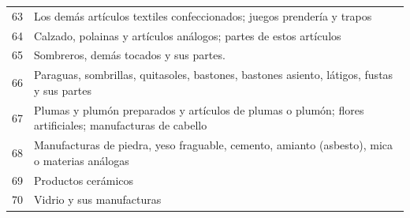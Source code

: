 \documentclass[a4paper,openright,12pt]{book}
\begin{document}
\begin{table}[]
{\begin{tabular}{@{}ll@{}}
63  & Los demás artículos textiles confeccionados; juegos prendería y trapos                                                                                                                                                                                                                         \\
64  & Calzado, polainas y artículos análogos; partes de estos artículos                                                                                                                                                                                                                              \\
65  & Sombreros, demás tocados y sus partes.                                                                                                                                                                                                                                                         \\
66  & Paraguas, sombrillas, quitasoles, bastones, bastones asiento, látigos, fustas y sus partes                                                                                                                                                                                                     \\
67  & Plumas y plumón preparados y artículos de plumas o plumón; flores artificiales; manufacturas de cabello                                                                                                                                                                                        \\
68  & Manufacturas de piedra, yeso fraguable, cemento, amianto (asbesto), mica o materias análogas                                                                                                                                                                                                   \\
69  & Productos cerámicos                                                                                                                                                                                                                                                                            \\
70  & Vidrio y sus manufacturas                                                                                                                                                                                                                                                                      \\

\end{tabular}}
\end{table}
\end{document}
